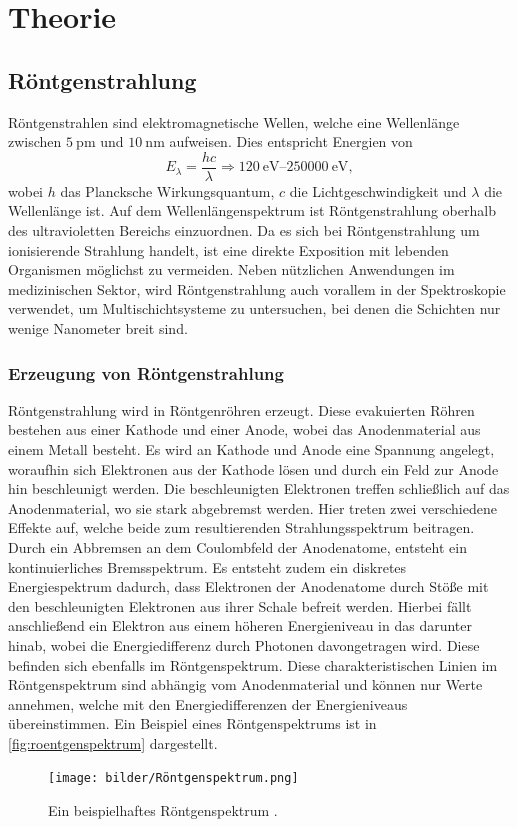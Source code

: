 \chapter{Theorie}
\label{cha:Theorie}

\section{Röntgenstrahlung}

Röntgenstrahlen sind elektromagnetische Wellen, welche eine Wellenlänge zwischen $\qty{5}{\pico\metre}$ und $\qty{10}{\nano\metre}$ aufweisen.
Dies entspricht Energien von
\begin{equation*}
    E_{\lambda} = \frac{hc}{\lambda} \Rightarrow \qtyrange{120}{250000}{\electronvolt},
\end{equation*}
wobei $h$ das Plancksche Wirkungsquantum, $c$ die Lichtgeschwindigkeit und $\lambda$ die Wellenlänge ist. Auf dem Wellenlängenspektrum ist Röntgenstrahlung
oberhalb des ultravioletten Bereichs einzuordnen. Da es sich bei Röntgenstrahlung um ionisierende Strahlung handelt, ist eine direkte Exposition mit lebenden
Organismen möglichst zu vermeiden. Neben nützlichen Anwendungen im medizinischen Sektor, wird Röntgenstrahlung auch vorallem in der Spektroskopie verwendet,
um Multischichtsysteme zu untersuchen, bei denen die Schichten nur wenige Nanometer breit sind.

\subsection{Erzeugung von Röntgenstrahlung}
Röntgenstrahlung wird in Röntgenröhren erzeugt. Diese evakuierten Röhren bestehen aus einer Kathode und einer Anode, wobei das Anodenmaterial aus einem Metall besteht. 
Es wird an Kathode und Anode eine Spannung angelegt, woraufhin sich Elektronen aus der Kathode lösen und durch ein Feld zur Anode hin beschleunigt werden. Die 
beschleunigten Elektronen treffen schließlich auf das Anodenmaterial, wo sie stark abgebremst werden. Hier treten zwei verschiedene Effekte auf, welche beide
zum resultierenden Strahlungsspektrum beitragen.\\
Durch ein Abbremsen an dem Coulombfeld der Anodenatome, entsteht ein kontinuierliches Bremsspektrum. Es entsteht zudem ein diskretes Energiespektrum dadurch,
dass Elektronen der Anodenatome durch Stöße mit den beschleunigten Elektronen aus ihrer Schale befreit werden. Hierbei fällt anschließend ein Elektron aus einem
höheren Energieniveau in das darunter hinab, wobei die Energiedifferenz durch Photonen davongetragen wird. Diese befinden sich ebenfalls im Röntgenspektrum.
Diese charakteristischen Linien im Röntgenspektrum sind abhängig vom Anodenmaterial und können nur Werte annehmen, welche mit den Energiedifferenzen der Energieniveaus
übereinstimmen. Ein Beispiel eines Röntgenspektrums ist in \autoref{fig:roentgenspektrum} dargestellt.
\begin{figure}
    \centering
    \texttt{[image: bilder/Röntgenspektrum.png]}
    \caption{Ein beispielhaftes Röntgenspektrum \cite{Uni_Goett}.}
    \label{fig:roentgenspektrum}
\end{figure}

